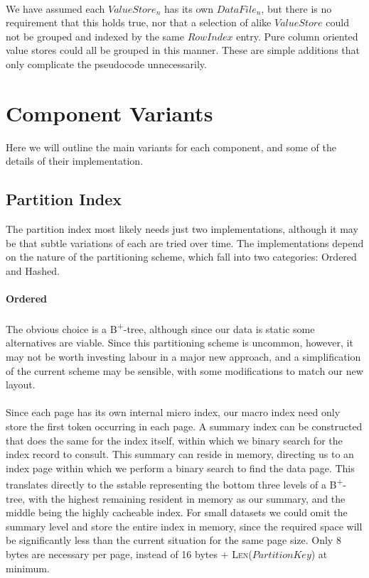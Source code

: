 \documentclass[fleqn]{article}
\begin{document}
\paragraph{}
    We have assumed each $ValueStore_n$ has its own $DataFile_n$, but there is no requirement that this holds true,
    nor that a selection of alike $ValueStore$ could not be grouped and indexed by the same $RowIndex$ entry. Pure 
    column oriented value stores could all be grouped in this manner. These are simple additions that only 
    complicate the pseudocode unnecessarily.

\section{Component Variants}
Here we will outline the main variants for each component, and some of the details of their implementation.

\subsection{Partition Index}
The partition index most likely needs just two implementations, although it may be that subtle variations
of each are tried over time. The implementations depend on the nature of the partitioning scheme, which
fall into two categories: Ordered and Hashed.
\paragraph{Ordered}
\paragraph{}
    The obvious choice is a B\textsuperscript{+}-tree, although since our data is static some alternatives are viable.
    Since this partitioning scheme is uncommon, however, it may not be worth investing labour in a major new 
    approach, and a simplification of the current scheme may be sensible, with some modifications to match our
    new layout.
    \\\\
    Since each page has its own internal micro index, our macro index need only store the first token occurring 
    in each page. A summary index can be constructed that does the same for the index itself, within which
    we binary search for the index record to consult. This summary can reside in memory, directing us to an 
    index page within which we perform a binary search to find the data page. 
    This translates directly to the sstable representing the 
    bottom three levels of a B\textsuperscript{+}-tree, with the highest remaining resident in memory as our 
    summary, and the middle being the highly cacheable index. For small datasets we could omit the summary level
    and store the entire index in memory, since the required space will be significantly less than the current
    situation for the same page size. Only 8 bytes are necessary per page, instead of 16 bytes 
    + \textsc{Len}($PartitionKey$) at minimum.
    
\end{document}
